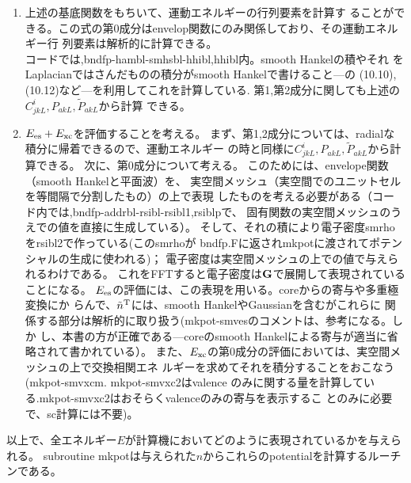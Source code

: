 \documentclass[a4paper,10pt,aip,onecolumn,amsmath,amssymb,floatfix,rmp]{revtex4-1}
\newcommand{\bfk}{{\bf k}}
\newcommand{\bfG}{{\bf G}}
\def\tnT{\tilde{n}^{\rm T}}
\def\tnT{\tilde{n}^{\rm T}}
\begin{document}
\begin{enumerate}
\item
上述の基底関数をもちいて、運動エネルギーの行列要素を計算す
ることができる。この式の第0成分はenvelop関数にのみ関係しており、その運動エネルギー行
列要素は解析的に計算できる。\\
コードでは,bndfp-hambl-smhsbl-hhibl,hhibl内。smooth Hankelの積やそれ
をLaplacianではさんだものの積分がsmooth Hankelで書けること---\cite{Bott98}の
(10.10),(10.12)など---を利用してこれを計算している.
第1,第2成分に関しても上述の$C^i_{jkL},{P}_{akL},\tilde{P}_{akL}$から計算
できる。

\item
$E_{\rm es}+E_{\rm xc}$を評価することを考える。
まず、第1,2成分については、radialな積分に帰着できるので、運動エネルギー
の時と同様に$C^i_{jkL},{P}_{akL},\tilde{P}_{akL}$から計算できる。
次に、第0成分について考える。
このためには、envelope関数（smooth Hankelと平面波）を、
実空間メッシュ（実空間でのユニットセルを等間隔で分割したもの）の上で表現
したものを考える必要がある（コード内では,bndfp-addrbl-rsibl-rsibl1,rsiblpで、
固有関数の実空間メッシュのうえでの値を直接に生成している）。
そして、それの積により電子密度smrhoをrsibl2で作っている(このsmrhoが
bndfp.Fに返されmkpotに渡されてポテンシャルの生成に使われる)；
電子密度は実空間メッシュの上での値で与えられるわけである。
これをFFTすると電子密度は$\bfG$で展開して表現されていることになる。
$E_{\rm es}$の評価には、この表現を用いる。coreからの寄与や多重極変換にか
らんで、$\tnT$には、smooth HankelやGaussianを含むがこれらに
関係する部分は解析的に取り扱う(mkpot-smvesのコメントは、参考になる。しか
し、本書の方が正確である---coreのsmooth Hankelによる寄与が適当に省略されて書かれている）。
また、$E_{\rm xc}$の第0成分の評価においては、実空間メッシュの上で交換相関エネ
ルギーを求めてそれを積分することをおこなう\\
(mkpot-smvxcm. mkpot-smvxc2はvalence
のみに関する量を計算している.mkpot-smvxc2はおそらくvalenceのみの寄与を表示するこ
とのみに必要で、sc計算には不要)。
\end{enumerate}

以上で、全エネルギー$E$が計算機においてどのように表現されているかを与えられる。
subroutine mkpotは与えられた$n$からこれらのpotentialを計算するルーチンである。

\end{document}
